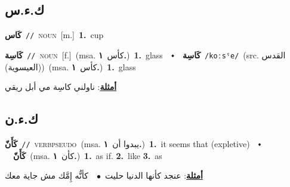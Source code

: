 \documentclass[10pt,a4paper,twoside]{article} %
\begin{document}
\begin{multicols}{2}
\vspace{-3mm}
\subsection*{\color{blue}\foreignlanguage{arabic}{ك.ء.س}\color{blue}{}} 

{\setlength\topsep{0pt}\textbf{\foreignlanguage{arabic}{كَاس}}\ {\color{gray}\texttt{//}\color{black}}\ \textsc{noun}\ [m.]\ \textbf{1.}~cup\ 

{\setlength\topsep{0pt}\textbf{\foreignlanguage{arabic}{كَاسِة}}\ {\color{gray}\texttt{//}\color{black}}\ \textsc{noun}\ [f.]\ \color{gray}(msa. \foreignlanguage{arabic}{كأس}~\foreignlanguage{arabic}{\textbf{١.}})\color{black}\ \textbf{1.}~glass\ \ $\smblkdiamond$\ \ \setlength\topsep{0pt}\textbf{\foreignlanguage{arabic}{كَاسِة}}\ {\color{gray}\texttt{/koːsˤe/}\color{black}}\ (src. \color{gray}\foreignlanguage{arabic}{القدس (العيسوية)}\color{black})\ \color{gray}(msa. \foreignlanguage{arabic}{كأس}~\foreignlanguage{arabic}{\textbf{١.}})\color{black}\ \textbf{1.}~glass\  \begin{flushright}\color{gray}\foreignlanguage{arabic}{\textbf{\underline{\foreignlanguage{arabic}{أمثلة}}}: ناولني كاسِة مي أبل ريقي}\end{flushright}\color{black}} \vspace{2mm}

\vspace{-3mm}
\subsection*{\color{blue}\foreignlanguage{arabic}{ك.ء.ن}\color{blue}{ (ntws)}} 

{\setlength\topsep{0pt}\textbf{\foreignlanguage{arabic}{كَأَنّ}}\ {\color{gray}\texttt{//}\color{black}}\ \textsc{verb\textunderscore pseudo}\ \color{gray}(msa. \foreignlanguage{arabic}{يبدوا أن}~\foreignlanguage{arabic}{\textbf{١.}})\color{black}\ \textbf{1.}~it seems that (expletive)\ \ $\smblkdiamond$\ \ \setlength\topsep{0pt}\textbf{\foreignlanguage{arabic}{كَأَنّ}}\ \color{gray}(msa. \foreignlanguage{arabic}{كأن}~\foreignlanguage{arabic}{\textbf{١.}})\color{black}\ \textbf{1.}~as if.  \textbf{2.}~like  \textbf{3.}~as\  \begin{flushright}\color{gray}\foreignlanguage{arabic}{\textbf{\underline{\foreignlanguage{arabic}{أمثلة}}}: عنجد كأنها الدنيا حليت\ $\bullet$\ \  كأنُّه إِمَّك مش جاية معك}\end{flushright}\color{black}} \vspace{2mm}

}
\end{multicols}
\end{document}
